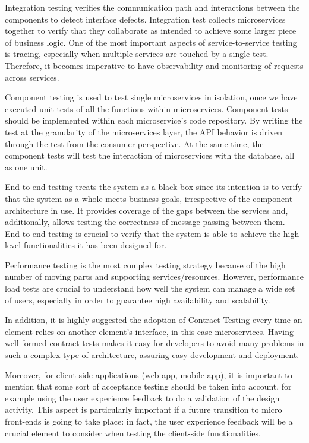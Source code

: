 Integration testing verifies the communication path and interactions between the components to detect interface defects. Integration test collects microservices together to verify that they collaborate as intended to achieve some larger piece of business logic.
One of the most important aspects of service-to-service testing is tracing, especially when multiple services are touched by a single test. Therefore, it becomes imperative to have observability and monitoring of requests across services.
\newline

Component testing is used to test single microservices in isolation, once we have executed unit tests of all the functions within microservices. Component tests should be implemented within each microservice’s code repository. By writing the test at the granularity of the microservices layer, the API behavior is driven through the test from the consumer perspective. At the same time, the component tests will test the interaction of microservices with the database, all as one unit.
\newline

End-to-end testing treats the system as a black box since its intention is to verify that the system as a whole meets business goals, irrespective of the component architecture in use. It provides coverage of the gaps between the services and, additionally, allows testing the  correctness of message passing between them. End-to-end testing is crucial to verify that the system is able to achieve the high-level functionalities it has been designed for.
\newline

Performance testing is the most complex testing strategy because of the high number of moving parts and supporting services/resources. However, performance load tests are crucial to understand how well the system can manage a wide set of users, especially in order to guarantee high availability and scalability.
\newline

In addition, it is highly suggested the adoption of Contract Testing every time an element relies on another element’s interface, in this case microservices. Having well-formed contract tests makes it easy for developers to avoid many problems in such a complex type of architecture, assuring easy development and deployment.
\newline

Moreover, for client-side applications (web app, mobile app), it is important to mention that some sort of acceptance testing should be taken into account, for example using the user experience feedback to do a validation of the design activity. This aspect is particularly important if a future transition to micro front-ends is going to take place: in fact, the user experience feedback will be a crucial element to consider when testing the client-side functionalities.
\newline

